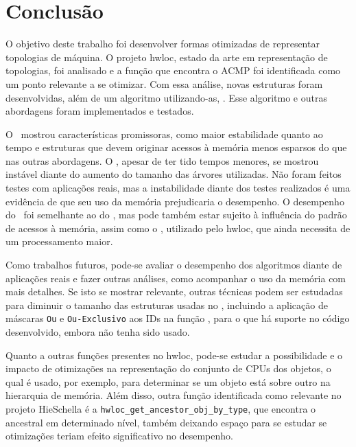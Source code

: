 \chapter{Conclusão}
\label{cap:conclusao}


O objetivo deste trabalho foi desenvolver formas otimizadas de representar topologias de máquina.
O projeto hwloc, estado da arte em representação de topologias, foi analisado e a função que encontra o ACMP foi identificada como um ponto relevante a se otimizar.
Com essa análise,
novas estruturas foram desenvolvidas, além de um algoritmo utilizando-as, \Novo.
Esse algoritmo e outras abordagens foram implementados e testados.

O \Novo\ mostrou características promissoras, como maior estabilidade quanto ao tempo e estruturas que devem originar acessos à memória menos esparsos do que nas outras abordagens.
O \Matriz, apesar de ter tido tempos menores, se mostrou instável diante do aumento do tamanho das árvores utilizadas.
Não foram feitos testes com aplicações reais, mas a instabilidade diante dos testes realizados é uma evidência de que seu uso da memória prejudicaria o desempenho.
O desempenho do \Simples\ foi semelhante ao do \Novo, mas pode também estar sujeito à influência do padrão de acessos à memória, assim como o \Hwloc, utilizado pelo hwloc, que ainda necessita de um processamento maior.


Como trabalhos futuros,
pode-se avaliar o desempenho dos algoritmos diante de aplicações reais
e fazer outras análises, como acompanhar o uso da memória com mais detalhes.
Se isto se mostrar relevante,
outras técnicas podem ser estudadas para diminuir o tamanho das estruturas usadas no \Novo,
incluindo a aplicação de máscaras \texttt{Ou} e \texttt{Ou-Exclusivo} aos IDs na função \Espalha,
para o que há suporte no código desenvolvido, embora não tenha sido usado.

Quanto a outras funções presentes no hwloc, pode-se estudar a possibilidade e o impacto de otimizações na representação do conjunto de CPUs dos objetos, o qual é usado, por exemplo, para determinar se um objeto está sobre outro na hierarquia de memória.
Além disso, outra função identificada como relevante no projeto HieSchella é a \mbox{\texttt{hwloc\_get\_ancestor\_obj\_by\_type}}, que encontra o ancestral em determinado nível, também deixando espaço para se estudar se otimizações teriam efeito significativo no desempenho.


